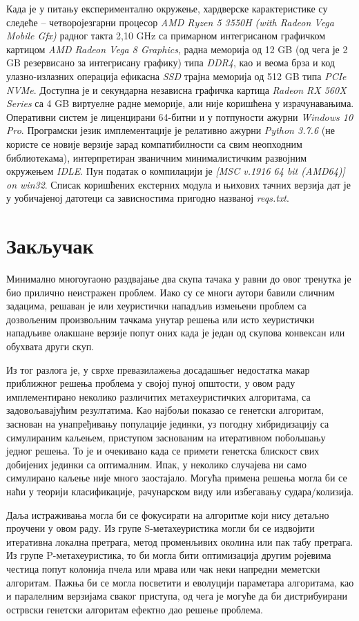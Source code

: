 \documentclass[a4paper]{article}
\begin{document}
Када је у питању експериментално окружење, хардверске карактеристике су следеће -- четворојезгарни процесор \textit{AMD Ryzen 5 3550H (with Radeon Vega Mobile Gfx)} радног такта 2,10 GHz са примарном интегрисаном графичком картицом \textit{AMD Radeon Vega 8 Graphics}, радна меморија од 12 GB (од чега је 2 GB резервисано за интегрисану графику) типа \textit{DDR4}, као и веома брза и код улазно-излазних операција ефикасна \textit{SSD} трајна меморија од 512 GB типа \textit{PCIe NVMe}. Доступна је и секундарна независна графичка картица \textit{Radeon RX 560X Series} са 4 GB виртуелне радне меморије, али није коришћена у израчунавањима. Оперативни систем је лиценцирани 64-битни и у потпуности ажурни \textit{Windows 10 Pro}. Програмски језик имплементације је релативно ажурни \textit{Python 3.7.6} (не користе се новије верзије зарад компатибилности са свим неопходним библиотекама), интерпретиран званичним минималистичким развојним окружењем \textit{IDLE}. Пун податак о компилацији је \textit{[MSC v.1916 64 bit (AMD64)] on win32}. Списак коришћених екстерних модула и њихових тачних верзија дат је у уобичајеној датотеци са зависностима пригодно названој \textit{reqs.txt}.

\section{Закључак}

Минимално многоугаоно раздвајање два скупа тачака у равни до овог тренутка је био прилично неистражен проблем. Иако су се многи аутори бавили сличним задацима, решаван је или хеуристички нападљив измењени проблем са дозвољеним произвољним тачкама унутар решења или исто хеуристички нападљиве олакшане верзије попут оних када је један од скупова конвексан или обухвата други скуп.

Из тог разлога је, у сврхе превазилажења досадашњег недостатка макар приближног решења проблема у својој пуној општости, у овом раду имплементирано неколико различитих метахеуристичких алгоритама, са задовољавајућим резултатима. Као најбољи показао се генетски алгоритам, заснован на унапређивању популације јединки, уз погодну хибридизацију са симулираним каљењем, приступом заснованим на итеративном побољшању једног решења. То је и очекивано када се примети генетска блискост свих добијених јединки са оптималним. Ипак, у неколико случајева ни само симулирано каљење није много заостајало. Могућа примена решења могла би се наћи у теорији класификације, рачунарском виду или избегавању судара/колизија.

Даља истраживања могла би се фокусирати на алгоритме који нису детаљно проучени у овом раду. Из групе S-метахеуристика могли би се издвојити итеративна локална претрага, метод променљивих околина или пак табу претрага. Из групе P-метахеуристика, то би могла бити оптимизација другим ројевима честица попут колонија пчела или мрава или чак неки напредни меметски алгоритам. Пажња би се могла посветити и еволуцији параметара алгоритама, као и паралелним верзијама сваког приступа, од чега је могуће да би дистрибуирани острвски генетски алгоритам ефектно дао решење проблема.

\newpage
{}
\appendix


\end{document}
